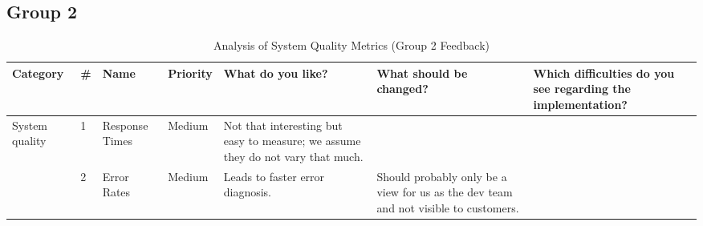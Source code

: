 \documentclass[
	english,
	ruledheaders=section,%
	class=report,%
	thesis={type=bachelor},%
	accentcolor=1b,%
	custommargins=true,%
	marginpar=false,%
	parskip=half-,%
	fontsize=11pt,%
	DIV=14,
]{tudapub}
\begin{document}
\clearpage %

\subsection{Group 2}

\begin{table}
    \centering
    \small 
    \caption{Analysis of System Quality Metrics (Group 2 Feedback)}
    \label{tab:system_quality_g2}
    \begin{tabularx}{\textheight}{p{2.2cm} l >{\RaggedRight\arraybackslash}X l >{\RaggedRight\arraybackslash}X >{\RaggedRight\arraybackslash}X >{\RaggedRight\arraybackslash}X}
        \toprule
        \textbf{Category} & \textbf{\#} & \textbf{Name} & \textbf{Priority} & \textbf{What do you like?} & \textbf{What should be changed?} & \textbf{Which difficulties do you see regarding the implementation?} \\
        \midrule
        
        \multirow{2}{=}{System quality} 
        & 1 & Response Times & Medium & Not that interesting but easy to measure; we assume they do not vary that much. & & \\
        \cmidrule(l){2-7}
        & 2 & Error Rates & Medium & Leads to faster error diagnosis. & Should probably only be a view for us as the dev team and not visible to customers. & \\
        \bottomrule
    \end{tabularx}
\end{table}
\end{document}
